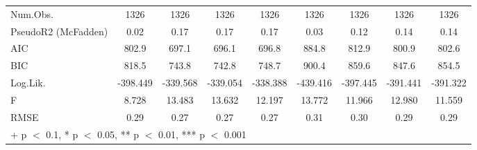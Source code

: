 \begin{table}
\begin{tabular}[t]{lcccccccc}
\midrule
Num.Obs. & 1326 & 1326 & 1326 & 1326 & 1326 & 1326 & 1326 & 1326\\
PseudoR2 (McFadden) & 0.02 & 0.17 & 0.17 & 0.17 & 0.03 & 0.12 & 0.14 & 0.14\\
AIC & 802.9 & 697.1 & 696.1 & 696.8 & 884.8 & 812.9 & 800.9 & 802.6\\
BIC & 818.5 & 743.8 & 742.8 & 748.7 & 900.4 & 859.6 & 847.6 & 854.5\\
Log.Lik. & -398.449 & -339.568 & -339.054 & -338.388 & -439.416 & -397.445 & -391.441 & -391.322\\
F & 8.728 & 13.483 & 13.632 & 12.197 & 13.772 & 11.966 & 12.980 & 11.559\\
RMSE & 0.29 & 0.27 & 0.27 & 0.27 & 0.31 & 0.30 & 0.29 & 0.29\\
\bottomrule
\multicolumn{9}{l}{\rule{0pt}{1em}+ p $<$ 0.1, * p $<$ 0.05, ** p $<$ 0.01, *** p $<$ 0.001}\\
\end{tabular}
\end{table}
